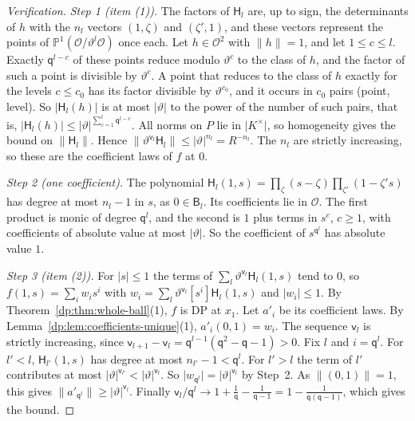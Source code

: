 \documentclass[11pt]{amsart}
\theoremstyle{definition}
\theoremstyle{remark}
\numberwithin{equation}{section}
\newcommand{\abs}[1]{\lvert #1\rvert}
\newcommand{\norm}[1]{\lVert #1\rVert}
\theoremstyle{plain}
\theoremstyle{definition}
\theoremstyle{plain}
\begin{document}
\begin{proof}[Verification]
\emph{Step 1 (item (1)).} The factors of $\mathsf H_l$ are, up to sign, the determinants of $h$ with the $n_l$ vectors $(1,\zeta)$ and $(\zeta',1)$, and these vectors represent the points of $\mathbb P^1(\mathcal O/\vartheta^l\mathcal O)$ once each. Let $h\in\mathcal O^2$ with $\norm h=1$, and let $1\le c\le l$. Exactly $\mathsf q^{l-c}$ of these points reduce modulo $\vartheta^c$ to the class of $h$, and the factor of such a point is divisible by $\vartheta^c$. A point that reduces to the class of $h$ exactly for the levels $c\le c_0$ has its factor divisible by $\vartheta^{c_0}$, and it occurs in $c_0$ pairs (point, level). So $\abs{\mathsf H_l(h)}$ is at most $\abs\vartheta$ to the power of the number of such pairs, that is, $\abs{\mathsf H_l(h)}\le\abs\vartheta^{\sum_{c=1}^l\mathsf q^{l-c}}$. All norms on $P$ lie in $\abs{K^\times}$, so homogeneity gives the bound on $\norm{\mathsf H_l}$. Hence $\norm{\vartheta^{\mathsf v_l}\mathsf H_l}\le\abs\vartheta^{n_l}=R^{-n_l}$. The $n_l$ are strictly increasing, so these are the coefficient laws of $f$ at $0$.

\emph{Step 2 (one coefficient).} The polynomial $\mathsf H_l(1,s)=\prod_\zeta(s-\zeta)\prod_{\zeta'}(1-\zeta's)$ has degree at most $n_l-1$ in $s$, as $0\in\mathsf B_l$. Its coefficients lie in $\mathcal O$. The first product is monic of degree $\mathsf q^l$, and the second is $1$ plus terms in $s^c$, $c\ge1$, with coefficients of absolute value at most $\abs\vartheta$. So the coefficient of $s^{\mathsf q^l}$ has absolute value $1$.

\emph{Step 3 (item (2)).} For $\abs s\le1$ the terms of $\sum_l\vartheta^{\mathsf v_l}\mathsf H_l(1,s)$ tend to $0$, so $f(1,s)=\sum_iw_is^i$ with $w_i=\sum_l\vartheta^{\mathsf v_l}[s^i]\mathsf H_l(1,s)$ and $\abs{w_i}\le1$. By Theorem~\ref{dp:thm:whole-ball}(1), $f$ is DP at $x_1$. Let $a'_i$ be its coefficient laws. By Lemma~\ref{dp:lem:coefficients-unique}(1), $a'_i(0,1)=w_i$. The sequence $\mathsf v_l$ is strictly increasing, since $\mathsf v_{l+1}-\mathsf v_l=\mathsf q^{l-1}(\mathsf q^2-\mathsf q-1)>0$. Fix $l$ and $i=\mathsf q^l$. For $l'<l$, $\mathsf H_{l'}(1,s)$ has degree at most $n_{l'}-1<\mathsf q^l$. For $l'>l$ the term of $l'$ contributes at most $\abs\vartheta^{\mathsf v_{l'}}<\abs\vartheta^{\mathsf v_l}$. So $\abs{w_{\mathsf q^l}}=\abs\vartheta^{\mathsf v_l}$ by Step~2. As $\norm{(0,1)}=1$, this gives $\norm{a'_{\mathsf q^l}}\ge\abs\vartheta^{\mathsf v_l}$. Finally $\mathsf v_l/\mathsf q^l\to1+\frac1{\mathsf q}-\frac1{\mathsf q-1}=1-\frac1{\mathsf q(\mathsf q-1)}$, which gives the bound.
\end{proof}
\end{document}
